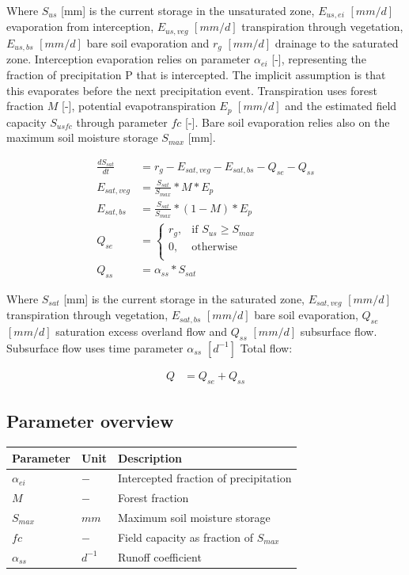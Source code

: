 Where $S_{us}$ [mm] is the current storage in the unsaturated zone, $E_{us,ei}$ $[mm/d]$ evaporation from interception, $E_{us,veg}$ $[mm/d]$ transpiration through vegetation, $E_{us,bs}$ $[mm/d]$ bare soil evaporation and $r_g$ $[mm/d]$ drainage to the saturated zone. Interception evaporation relies on parameter $\alpha_{ei}$ [-], representing the fraction of precipitation P that is intercepted. The implicit assumption is that this evaporates before the next precipitation event. Transpiration uses forest fraction $M$ [-], potential evapotranspiration $E_p$ $[mm/d]$ and the estimated field capacity $S_{usfc}$ through parameter $fc$ [-]. Bare soil evaporation relies also on the maximum soil moisture storage $S_{max}$ [mm]. 

\begin{align}
	\frac{dS_{sat}}{dt} &= r_g - E_{sat,veg}-E_{sat,bs} -Q_{se} - Q_{ss}\\
	E_{sat,veg} &= \frac{S_{sat}}{S_{max}}*M*E_p\\
	E_{sat,bs} &= \frac{S_{sat}}{S_{max}}*(1-M)*E_p\\
	Q_{se} &=\begin{cases}
		r_g, &\text{if } S_{us} \geq S_{max}\\
		0, & \text{otherwise} \\
	\end{cases}\\
	Q_{ss} &= \alpha_{ss}*S_{sat}
\end{align}

Where $S_{sat}$ [mm] is the current storage in the saturated zone, $E_{sat,veg}$ $[mm/d]$ transpiration through vegetation, $E_{sat,bs}$ $[mm/d]$ bare soil evaporation, $Q_{se}$ $[mm/d]$ saturation excess overland flow and $Q_{ss}$ $[mm/d]$ subsurface flow. Subsurface flow uses time parameter $\alpha_{ss}$ $[d^{-1}]$
Total flow:

\begin{align}
	Q &= Q_{se}+Q_{ss}
\end{align}

\subsection{Parameter overview}
\begin{table}[htbp]
  \centering
    \begin{tabular}{lll}
    \toprule
    Parameter & Unit  & Description \\
    \midrule
    $\alpha_{ei}$ & $-$   & Intercepted fraction of precipitation \\
    $M$   & $-$   & Forest fraction \\
    $S_{max}$ & $mm$  & Maximum soil moisture storage \\
    $fc$  & $-$   & Field capacity as fraction of $S_{max}$ \\
    $\alpha_{ss}$ & $d^{-1}$ & Runoff coefficient \\
    \bottomrule
    \end{tabular}%
  \label{tab:addlabel}%
\end{table}%

